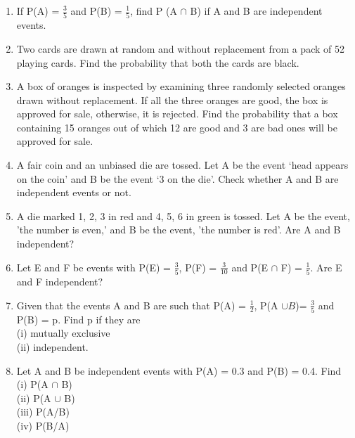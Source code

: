 \begin{enumerate}[label=\arabic*.,ref=\thesubsection.\theenumi]
\item If P(A) = $\frac{3}{5}$ and P(B) = $\frac{1}{5}$, find P (A $\cap$ B) if A and B are independent events.\\

\item Two cards are drawn at random and without replacement from a pack of 52 playing cards. Find the probability that both the cards are black.\\

\item A box of oranges is inspected by examining three randomly selected oranges drawn without replacement. If all the three oranges are good, the box is approved for sale, otherwise, it is rejected. Find the probability that a box containing 15 oranges out of which 12 are good and 3 are bad ones will be approved for sale.\\

\item A fair coin and an unbiased die are tossed. Let A be the event ‘head appears on
the coin’ and B be the event ‘3 on the die’. Check whether A and B are independent events or not.\\

\item A die marked 1, 2, 3 in red and 4, 5, 6 in green is tossed. Let A be the event, 'the number is even,' and B be the event, 'the number is red'. Are A and B
independent?\\

\item Let E and F be events with P(E) = $\frac{3}{5}$, P(F) = $\frac{3}{10}$ and  P(E $\cap$ F) = $\frac{1}{5}$. Are E and F independent?\\

\item Given that the events A and B are such that P(A) = $\frac{1}{2}$, P(A $\cup B$)= $\frac{3}{5}$ and P(B) = p. Find p if they are\\
(i) mutually exclusive\\
(ii) independent.\\

\item Let A and B be independent events with P(A) = 0.3 and P(B) = 0.4. Find\\
(i) P(A $\cap$ B)\\ 
(ii) P(A $\cup$ B)\\
(iii) P(A/B)\\
(iv) P(B/A)\\


\end{enumerate}
